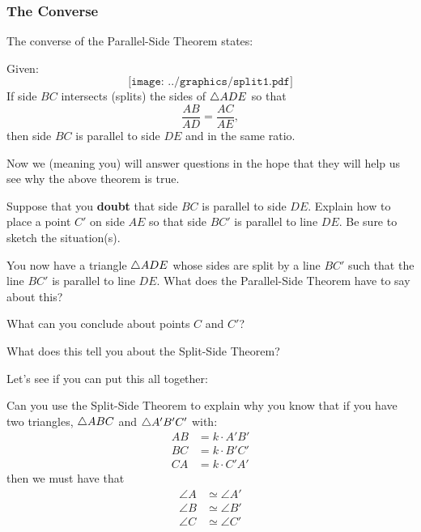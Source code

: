\subsubsection{The Converse}

The converse of the Parallel-Side Theorem states:

\begin{theorem} 
Given:
\[
\texttt{[image: ../graphics/split1.pdf]}
\]
If side $BC$ intersects (splits) the sides of $\triangle ADE$ so that
\[
\frac{AB}{AD} = \frac{AC}{AE},
\] 
then side $BC$ is parallel to side $DE$ and in the same ratio.
\end{theorem}


Now we (meaning you) will answer questions in the hope that they will
help us see why the above theorem is true.

\begin{question}
Suppose that you \textbf{doubt} that side $BC$ is parallel to side $DE$. Explain
how to place a point $C'$ on side $AE$ so that side $BC'$ is
parallel to line $DE$. Be sure to sketch the situation(s).
\end{question}
\QM

\begin{question} 
You now have a triangle $\triangle ADE$ whose sides are split by a line
$BC'$ such that the line $BC'$ is parallel to line $DE$. What does the
Parallel-Side Theorem have to say about this?
\end{question}
\QM

\begin{question} What can you conclude about points $C$ and $C'$?
\end{question}
\QM


\begin{question} 
What does this tell you about the Split-Side Theorem?
\end{question}
\QM




Let's see if you can put this all together:
\begin{question}
Can you use the Split-Side Theorem to explain why you know that
if you have two triangles, $\triangle ABC$ and $\triangle A'B'C'$ with:
\begin{align*}
AB &= k\cdot A'B'\\
BC &= k\cdot B'C'\\
CA &= k\cdot C'A'
\end{align*}
then we must have that
\begin{align*}
\angle A &\simeq \angle A'\\
\angle B &\simeq \angle B' \\
\angle C &\simeq \angle C'
\end{align*}
\end{question}
\QM


